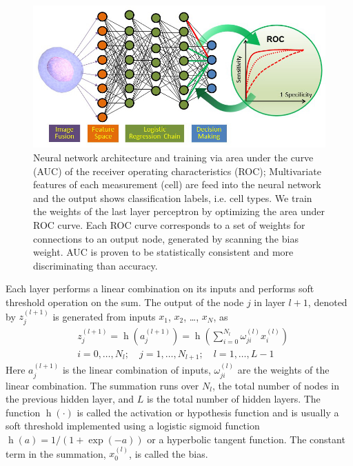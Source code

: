 \documentclass[aps,pra,reprint,superscriptaddress]{revtex4-1}
\DeclareMathOperator{\h}{h} %
\begin{document}
\begin{figure}
\includegraphics[scale=0.55]{FigureNeuralNet.jpg}
\caption{\label{fig:NeuralNet} Neural network architecture and training via area under the curve (AUC) of the receiver operating characteristics (ROC); Multivariate features of each measurement (cell) are feed into the neural network and the output shows classification labels, i.e. cell types. We train the weights of the last layer perceptron by optimizing the area under ROC curve. Each ROC curve corresponds to a set of weights for connections to an output node, generated by scanning the bias weight. AUC is proven to be statistically consistent and more discriminating than accuracy.}
\end{figure}

Each layer performs a linear combination on its inputs and performs soft threshold operation on the sum. The output of the node $j$ in layer $l+1$, denoted by $z_j^{(l+1)}$ is generated from inputs $x_1$, $x_2$, \ldots, $x_N$, as
\begin{equation}
\begin{split}
& z_j^{(l+1)} = \h(a_j^{(l+1)}) = \h(\sum_{i=0}^{N_l} \omega_{ji}^{(l)} x_i^{(l)})\\
& i =0,\dotsc,N_l;\quad j=1,\dotsc,N_{l+1};\quad l=1,\dotsc,L-1
\end{split}
\end{equation}
Here $a_j^{(l+1)}$ is the linear combination of inputs, $\omega_{ji}^{(l)}$ are the weights of the linear combination. The summation runs over $N_l$, the total number of nodes in the previous hidden layer, and $L$ is the total number of hidden layers. The function $\h(\cdot)$ is called the activation or hypothesis function and is usually a soft threshold implemented using a logistic sigmoid function $\h(a)=1/(1+\exp(-a))$ or a hyperbolic tangent function. The constant term in the summation, $x_0^{(l)}$, is called the bias.
\end{document}
